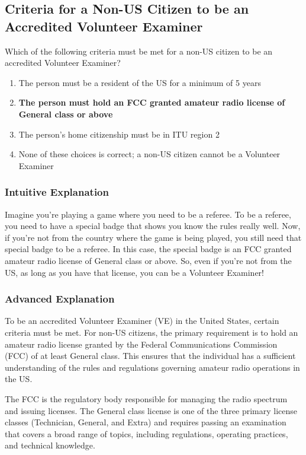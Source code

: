 \subsection{Criteria for a Non-US Citizen to be an Accredited Volunteer Examiner}
\label{G1D08}

\begin{tcolorbox}[colback=gray!10!white,colframe=black!75!black,title=G1D08]
Which of the following criteria must be met for a non-US citizen to be an accredited Volunteer Examiner?
\begin{enumerate}[label=\Alph*]
    \item The person must be a resident of the US for a minimum of 5 years
    \item \textbf{The person must hold an FCC granted amateur radio license of General class or above}
    \item The person’s home citizenship must be in ITU region 2
    \item None of these choices is correct; a non-US citizen cannot be a Volunteer Examiner
\end{enumerate}
\end{tcolorbox}

\subsubsection{Intuitive Explanation}
Imagine you're playing a game where you need to be a referee. To be a referee, you need to have a special badge that shows you know the rules really well. Now, if you're not from the country where the game is being played, you still need that special badge to be a referee. In this case, the special badge is an FCC granted amateur radio license of General class or above. So, even if you're not from the US, as long as you have that license, you can be a Volunteer Examiner!

\subsubsection{Advanced Explanation}
To be an accredited Volunteer Examiner (VE) in the United States, certain criteria must be met. For non-US citizens, the primary requirement is to hold an amateur radio license granted by the Federal Communications Commission (FCC) of at least General class. This ensures that the individual has a sufficient understanding of the rules and regulations governing amateur radio operations in the US.

The FCC is the regulatory body responsible for managing the radio spectrum and issuing licenses. The General class license is one of the three primary license classes (Technician, General, and Extra) and requires passing an examination that covers a broad range of topics, including regulations, operating practices, and technical knowledge.

